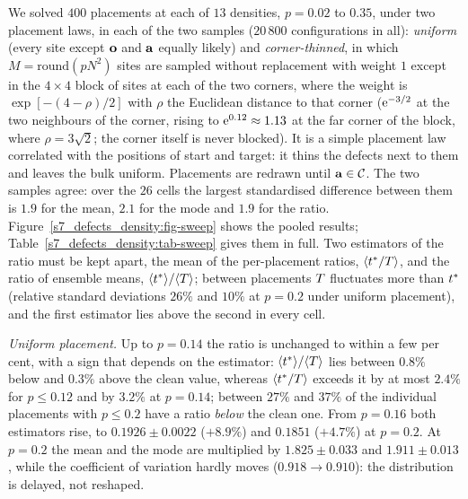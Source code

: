 We solved $400$ placements at each of $13$ densities, $p=0.02$ to $0.35$, under two placement laws, in each of the two
samples ($20\,800$ configurations in all): \emph{uniform} (every site except $\mathbf{o}$ and $\mathbf{a}$ equally likely) and
\emph{corner-thinned}, in which $M=\mathrm{round}(pN^{2})$ sites are sampled without replacement with weight $1$ except in
the $4\times4$ block of sites at each of the two corners, where the weight is $\exp[-(4-\rho)/2]$ with $\rho$ the
Euclidean distance to that corner ($\mathrm{e}^{-3/2}$ at the two neighbours of the corner, rising to $\mathrm{e}^{0.12}\approx1.13$ at the far
corner of the block, where $\rho=3\sqrt2$; the corner itself is never blocked). It is a simple placement law correlated with the positions of start and target: it
thins the defects next to them and leaves the bulk uniform. Placements are redrawn until $\mathbf{a}\in\mathcal{C}$. The two samples agree: over the $26$ cells the
largest standardised difference between them is $1.9$ for the mean, $2.1$ for the mode and $1.9$ for the ratio.
Figure~\ref{s7_defects_density:fig-sweep} shows the pooled results; Table~\ref{s7_defects_density:tab-sweep} gives them in
full. Two estimators of the ratio must be kept apart, the mean of the per-placement ratios, $\langle t^{*}/T\rangle$, and
the ratio of ensemble means, $\langle t^{*}\rangle/\langle T\rangle$; between placements $T$ fluctuates more than $t^{*}$
(relative standard deviations $26\%$ and $10\%$ at $p=0.2$ under uniform placement), and the first estimator lies above
the second in every cell.

\emph{Uniform placement.} Up to $p=0.14$ the ratio is unchanged to within a few per cent, with a sign that depends on the
estimator: $\langle t^{*}\rangle/\langle T\rangle$ lies between $0.8\%$ below and $0.3\%$ above the clean value, whereas
$\langle t^{*}/T\rangle$ exceeds it by at most $2.4\%$ for $p\le0.12$ and by $3.2\%$ at $p=0.14$; between $27\%$ and $37\%$ of the
individual placements with $p\le0.2$ have a ratio \emph{below} the clean one. From $p=0.16$ both estimators rise, to
$0.1926\pm0.0022$ ($+8.9\%$) and $0.1851$ ($+4.7\%$) at $p=0.2$. At $p=0.2$ the mean and the mode are multiplied by
$1.825\pm0.033$ and $1.911\pm0.013$, while the coefficient of variation hardly moves ($0.918\to0.910$): the distribution is
delayed, not reshaped.

